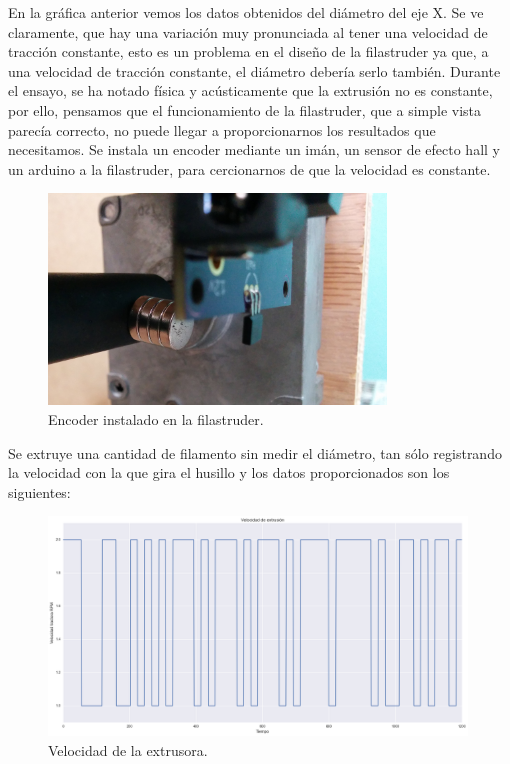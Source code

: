 En la gráfica anterior vemos los datos obtenidos del diámetro del eje X. Se ve claramente, que hay una variación muy pronunciada al tener una velocidad de tracción constante, esto es un problema en el diseño de la filastruder ya que, a una velocidad de tracción constante, el diámetro debería serlo también. Durante el ensayo, se ha notado física y acústicamente que la extrusión no es constante, por ello, pensamos que el funcionamiento de la filastruder, que a simple vista parecía correcto, no puede llegar a proporcionarnos los resultados que necesitamos. Se instala un encoder mediante un imán, un sensor de efecto hall y un arduino a la filastruder, para cercionarnos de que la velocidad es constante.

\begin{figure}[H]
    \centering
    \includegraphics[width=0.8\textwidth]{images/producciones/20072015/IMG_20150721_110502.jpg}
    \caption{Encoder instalado en la filastruder.}
    \label{fig:2007105-enc}
\end{figure}

Se extruye una cantidad de filamento sin medir el diámetro, tan sólo registrando la velocidad con la que gira el husillo y los datos proporcionados son los siguientes:


\begin{figure}[H]
    \centering
    \includegraphics[width=0.99\textwidth]{images/producciones/20072015/RPM_tract.png}
    \caption{Velocidad de la extrusora.}
    \label{fig:2007105-grafenc}
\end{figure}

